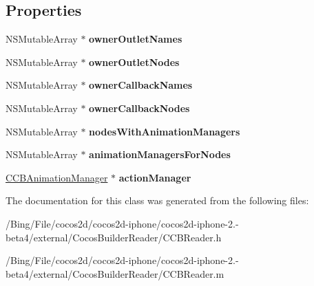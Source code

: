 \subsection*{Properties}
\begin{DoxyCompactItemize}
\item 
\hypertarget{interface_c_c_b_reader_a3ba064918af18a1029963271a221e895}{N\-S\-Mutable\-Array $\ast$ {\bfseries owner\-Outlet\-Names}}\label{interface_c_c_b_reader_a3ba064918af18a1029963271a221e895}

\item 
\hypertarget{interface_c_c_b_reader_a1c618cec92fcb6433aa4e8eaf54f49df}{N\-S\-Mutable\-Array $\ast$ {\bfseries owner\-Outlet\-Nodes}}\label{interface_c_c_b_reader_a1c618cec92fcb6433aa4e8eaf54f49df}

\item 
\hypertarget{interface_c_c_b_reader_a7fcb4a721e553ad2eef251c4333aad53}{N\-S\-Mutable\-Array $\ast$ {\bfseries owner\-Callback\-Names}}\label{interface_c_c_b_reader_a7fcb4a721e553ad2eef251c4333aad53}

\item 
\hypertarget{interface_c_c_b_reader_a38d81513d27554debaa996b400403095}{N\-S\-Mutable\-Array $\ast$ {\bfseries owner\-Callback\-Nodes}}\label{interface_c_c_b_reader_a38d81513d27554debaa996b400403095}

\item 
\hypertarget{interface_c_c_b_reader_a11a96a52deffa957599ecf33ee385789}{N\-S\-Mutable\-Array $\ast$ {\bfseries nodes\-With\-Animation\-Managers}}\label{interface_c_c_b_reader_a11a96a52deffa957599ecf33ee385789}

\item 
\hypertarget{interface_c_c_b_reader_ad5d84259d1d10e899e83a5c964205eef}{N\-S\-Mutable\-Array $\ast$ {\bfseries animation\-Managers\-For\-Nodes}}\label{interface_c_c_b_reader_ad5d84259d1d10e899e83a5c964205eef}

\item 
\hypertarget{interface_c_c_b_reader_aca43966376fa35fcf6147b6b30b2a0d0}{\hyperlink{interface_c_c_b_animation_manager}{C\-C\-B\-Animation\-Manager} $\ast$ {\bfseries action\-Manager}}\label{interface_c_c_b_reader_aca43966376fa35fcf6147b6b30b2a0d0}

\end{DoxyCompactItemize}


The documentation for this class was generated from the following files\-:\begin{DoxyCompactItemize}
\item 
/\-Bing/\-File/cocos2d/cocos2d-\/iphone/cocos2d-\/iphone-\/2.-\/beta4/external/\-Cocos\-Builder\-Reader/C\-C\-B\-Reader.\-h\item 
/\-Bing/\-File/cocos2d/cocos2d-\/iphone/cocos2d-\/iphone-\/2.-\/beta4/external/\-Cocos\-Builder\-Reader/C\-C\-B\-Reader.\-m\end{DoxyCompactItemize}
